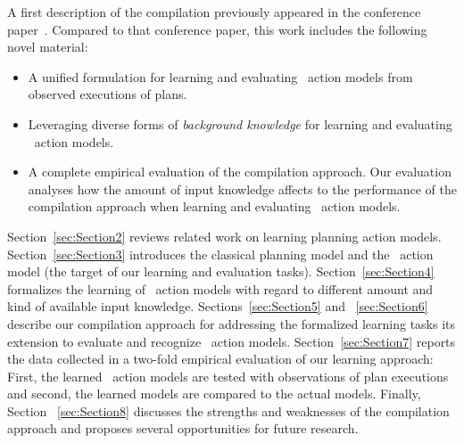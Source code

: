 A first description of the compilation previously appeared in the conference paper~\cite{aineto2018learning}. Compared to that conference paper, this work includes the following novel material:
\begin{itemize}
\item A unified formulation for learning and evaluating \strips\ action models from observed executions of plans. 
\item Leveraging diverse forms of {\em background knowledge} for learning and evaluating \strips\ action models.
\item A complete empirical evaluation of the compilation approach. Our evaluation analyses how the amount of input knowledge affects to the performance of the compilation approach when learning and evaluating \strips\ action models.
\end{itemize}

Section~\ref{sec:Section2} reviews related work on learning planning action models. Section~\ref{sec:Section3} introduces the classical planning model and the \strips\ action model (the target of our learning and evaluation tasks). Section~\ref{sec:Section4} formalizes the learning of \strips\ action models with regard to different amount and kind of available input knowledge. Sections~\ref{sec:Section5} and ~\ref{sec:Section6} describe our compilation approach for addressing the formalized learning tasks its extension to evaluate and recognize \strips\ action models. Section~\ref{sec:Section7} reports the data collected in a two-fold empirical evaluation of our learning approach: First, the learned \strips\ action models are tested with observations of plan executions and second, the learned models are compared to the actual models. Finally, Section ~\ref{sec:Section8} discusses the strengths and weaknesses of the compilation approach and proposes several opportunities for future research.

 
